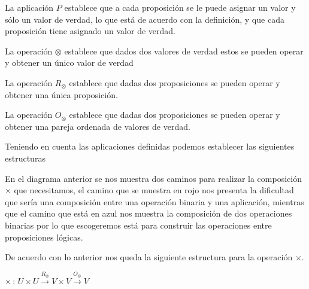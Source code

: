 \begin{lista}

\item La aplicación $P$ establece que a cada proposición se le puede
asignar un valor y sólo un valor de verdad, lo que está de acuerdo
con la definición, y que cada proposición tiene asignado un valor
de verdad.

\item La operación $\otimes$ establece que dados dos valores de
verdad estos se pueden operar y obtener un único valor de verdad

\item La operación $R_{\otimes}$ establece que dadas dos proposiciones
se pueden operar y obtener una única proposición.

\item La operación $O_{\otimes}$ establece que dadas dos proposiciones
se pueden operar y obtener una pareja ordenada de valores de verdad.

\end{lista}

Teniendo en cuenta las aplicaciones definidas podemos establecer las
siguientes estructuras 

\begin{center} 
\begin{large} 
 \end{large}  
\end{center} 

En el diagrama anterior se nos muestra dos caminos para realizar la
composición $\times$ que necesitamos, el camino que se muestra en
rojo nos presenta la dificultad que sería una composición entre una
operación binaria y una aplicación, mientras que el camino que está
en azul nos muestra la composición de dos operaciones binarias por
lo que escogeremos está para construir las operaciones entre proposiciones
lógicas.

De acuerdo con lo anterior nos queda la siguiente estructura para
la operación $\times$.

\begin{center} $\times\,:\,U\times U\overset{R_{\otimes}}{\rightarrow}V\times V\overset{O_{\otimes}}{\rightarrow}V$
\end{center}

